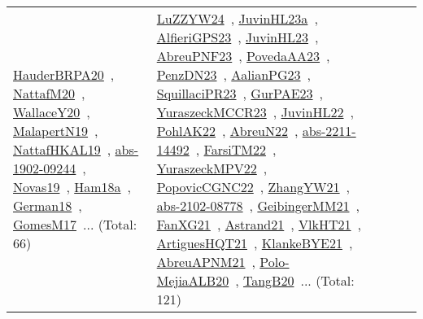 {\begin{longtable}{lp{3cm}>{\raggedright\arraybackslash}p{6cm}>{\raggedright\arraybackslash}p{6cm}>{\raggedright\arraybackslash}p{8cm}}
\href{../works/HauderBRPA20.pdf}{HauderBRPA20}~\cite{HauderBRPA20}, \href{../works/NattafM20.pdf}{NattafM20}~\cite{NattafM20}, \href{../works/WallaceY20.pdf}{WallaceY20}~\cite{WallaceY20}, \href{../works/MalapertN19.pdf}{MalapertN19}~\cite{MalapertN19}, \href{../works/NattafHKAL19.pdf}{NattafHKAL19}~\cite{NattafHKAL19}, \href{../works/abs-1902-09244.pdf}{abs-1902-09244}~\cite{abs-1902-09244}, \href{../works/Novas19.pdf}{Novas19}~\cite{Novas19}, \href{../works/Ham18a.pdf}{Ham18a}~\cite{Ham18a}, \href{../works/German18.pdf}{German18}~\cite{German18}, \href{../works/GomesM17.pdf}{GomesM17}~\cite{GomesM17}... (Total: 66) & \href{../works/LuZZYW24.pdf}{LuZZYW24}~\cite{LuZZYW24}, \href{../works/JuvinHL23a.pdf}{JuvinHL23a}~\cite{JuvinHL23a}, \href{../works/AlfieriGPS23.pdf}{AlfieriGPS23}~\cite{AlfieriGPS23}, \href{../works/JuvinHL23.pdf}{JuvinHL23}~\cite{JuvinHL23}, \href{../works/AbreuPNF23.pdf}{AbreuPNF23}~\cite{AbreuPNF23}, \href{../works/PovedaAA23.pdf}{PovedaAA23}~\cite{PovedaAA23}, \href{../works/PenzDN23.pdf}{PenzDN23}~\cite{PenzDN23}, \href{../works/AalianPG23.pdf}{AalianPG23}~\cite{AalianPG23}, \href{../works/SquillaciPR23.pdf}{SquillaciPR23}~\cite{SquillaciPR23}, \href{../works/GurPAE23.pdf}{GurPAE23}~\cite{GurPAE23}, \href{../works/YuraszeckMCCR23.pdf}{YuraszeckMCCR23}~\cite{YuraszeckMCCR23}, \href{../works/JuvinHL22.pdf}{JuvinHL22}~\cite{JuvinHL22}, \href{../works/PohlAK22.pdf}{PohlAK22}~\cite{PohlAK22}, \href{../works/AbreuN22.pdf}{AbreuN22}~\cite{AbreuN22}, \href{../works/abs-2211-14492.pdf}{abs-2211-14492}~\cite{abs-2211-14492}, \href{../works/FarsiTM22.pdf}{FarsiTM22}~\cite{FarsiTM22}, \href{../works/YuraszeckMPV22.pdf}{YuraszeckMPV22}~\cite{YuraszeckMPV22}, \href{../works/PopovicCGNC22.pdf}{PopovicCGNC22}~\cite{PopovicCGNC22}, \href{../works/ZhangYW21.pdf}{ZhangYW21}~\cite{ZhangYW21}, \href{../works/abs-2102-08778.pdf}{abs-2102-08778}~\cite{abs-2102-08778}, \href{../works/GeibingerMM21.pdf}{GeibingerMM21}~\cite{GeibingerMM21}, \href{../works/FanXG21.pdf}{FanXG21}~\cite{FanXG21}, \href{../works/Astrand21.pdf}{Astrand21}~\cite{Astrand21}, \href{../works/VlkHT21.pdf}{VlkHT21}~\cite{VlkHT21}, \href{../works/ArtiguesHQT21.pdf}{ArtiguesHQT21}~\cite{ArtiguesHQT21}, \href{../works/KlankeBYE21.pdf}{KlankeBYE21}~\cite{KlankeBYE21}, \href{../works/AbreuAPNM21.pdf}{AbreuAPNM21}~\cite{AbreuAPNM21}, \href{../works/Polo-MejiaALB20.pdf}{Polo-MejiaALB20}~\cite{Polo-MejiaALB20}, \href{../works/TangB20.pdf}{TangB20}~\cite{TangB20}... (Total: 121)\\

\end{longtable}}
